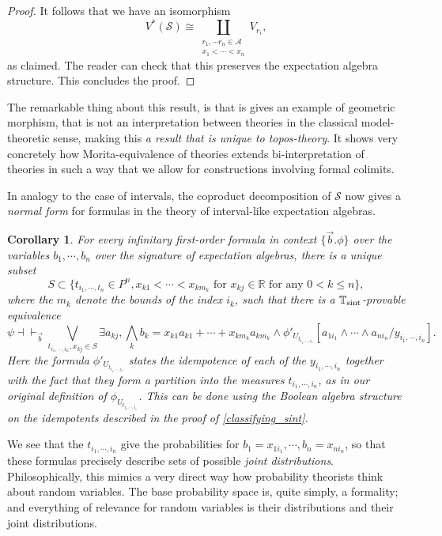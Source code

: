 \documentclass[a4paper]{amsproc}
\theoremstyle{plain}
\newtheorem{corollary}[theorem]{Corollary}
\theoremstyle{definition}
\theoremstyle{remark}
\numberwithin{equation}{section}
\begin{document}
\begin{proof}
    It follows that we have an isomorphism \[V^*(\mathcal{S}) \cong \coprod_{\substack{r_1, \cdots r_n \in \mathcal{A} \\ x_1 < \cdots < x_n}} V_{r_i},\] as claimed. The reader can check that this preserves the expectation algebra structure. This concludes the proof.
\end{proof}

The remarkable thing about this result, is that is gives an example of geometric morphism, that is not an interpretation between theories in the classical model-theoretic sense, making this \emph{a result that is unique to topos-theory}. It shows very concretely how Morita-equivalence of theories extends bi-interpretation of theories in such a way that we allow for constructions involving formal colimits.

In analogy to the case of intervals, the coproduct decomposition of $\mathcal{S}$ now gives a \emph{normal form} for formulas in the theory of interval-like expectation algebras.

\begin{corollary}\label{simple_normal_form}
    For every infinitary first-order formula in context $\{\vec{b} . \phi \}$ over the variables $b_1,\cdots,b_n$ over the signature of expectation algebras, there is a unique subset \[S \subset \{ t_{i_1,\cdots,t_n} \in P^n, x_{k 1} < \cdots < x_{k m_k}\text{ for }x_{k j} \in \mathbb{R} \text{ for any } 0 < k \le n \},\] where the $m_k$ denote the bounds of the index $i_k$, such that there is a $\mathbb{T}_{\textup{sint}}$-provable equivalence
    \[
     \psi \dashv \vdash_{\vec{b}} \bigvee_{t_{i_1,\cdots,i_n}, x_{k j} \in S} \exists a_{k j}, \bigwedge_k b_k = x_{k 1} a_{k 1} + \cdots + x_{k m_k} a_{k m_k}\wedge \phi'_{U_{t_{i_1,\cdots, i_n}}}[a_{1 i_1} \wedge \cdots \wedge a_{n i_n} / y_{i_1,\cdots,i_n}] .
    \]
    Here the formula $\phi'_{U_{t_{i_1,\cdots, i_n}}}$ states the idempotence of each of the $y_{i_1,\cdots,i_n}$ together with the fact that they form a partition into the measures $t_{i_1,\cdots,i_n}$, as in our original definition of $\phi_{U_{t_{i_1,\cdots, i_n}}}$. This can be done using the Boolean algebra structure on the idempotents described in the proof of \ref{classifying_sint}.
\end{corollary}

We see that the $t_{i_1,\cdots,i_n}$ give the probabilities for $b_1 = x_{1i_1},\cdots, b_n = x_{ni_n}$, so that these formulas precisely describe sets of possible \emph{joint distributions}. Philosophically, this mimics a very direct way how probability theorists think about random variables. The base probability space is, quite simply, a formality; and everything of relevance for random variables is their distributions and their joint distributions.
\end{document}
